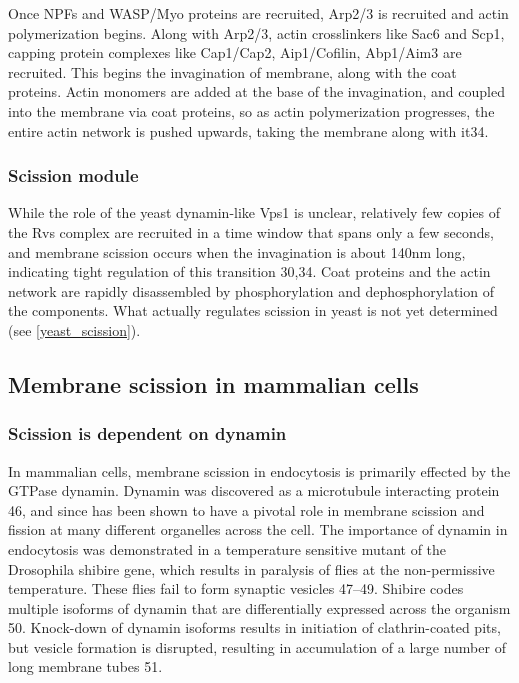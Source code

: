			\vspace{5mm}
			Once NPFs and WASP/Myo proteins are recruited, Arp2/3 is recruited and actin polymerization begins. Along with Arp2/3, actin crosslinkers like Sac6 and Scp1, capping protein complexes like Cap1/Cap2, Aip1/Cofilin, Abp1/Aim3 are recruited. This begins the invagination of membrane, along with the coat proteins. Actin monomers are added at the base of the invagination, and coupled into the membrane via coat proteins, so as actin polymerization progresses, the entire actin network is pushed upwards, taking the membrane along with it34.

			\subsubsection{Scission module}
		While the role of the yeast dynamin-like Vps1 is unclear, relatively few copies of the Rvs complex are recruited in a time window that spans only a few seconds, and membrane scission occurs when the invagination is about 140nm long, indicating tight regulation of this transition 30,34. Coat proteins and the actin network are rapidly disassembled by phosphorylation and dephosphorylation of the components.  What actually regulates scission in yeast is not yet determined (see \ref{yeast_scission}).

		
\subsection{Membrane scission in mammalian cells}
		\subsubsection{Scission is dependent on dynamin} 
		In mammalian cells, membrane scission in endocytosis is primarily effected by the GTPase dynamin. Dynamin was discovered as a microtubule interacting protein 46, and since has been shown to have a pivotal role in membrane scission and fission at many different organelles across the cell. The importance of dynamin in endocytosis was demonstrated in a temperature sensitive mutant of the Drosophila shibire gene, which results in paralysis of flies at the non-permissive temperature. These flies fail to form synaptic vesicles 47–49. Shibire codes multiple isoforms of dynamin that are differentially expressed across the organism 50. Knock-down of dynamin isoforms results in initiation of clathrin-coated pits, but vesicle formation is disrupted, resulting in accumulation of a large number of long membrane tubes 51. 

